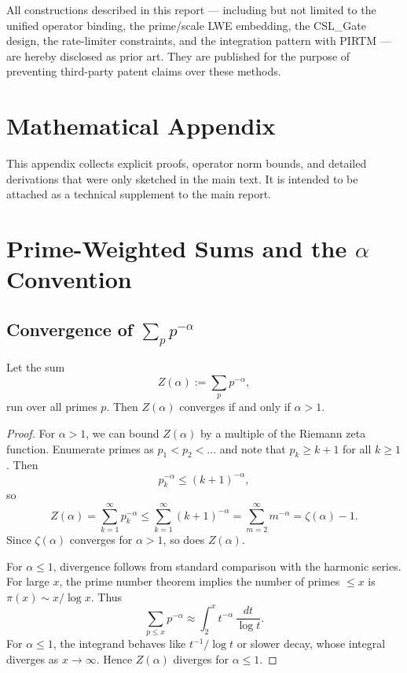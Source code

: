 \documentclass[11pt]{article}
\begin{document}
All constructions described in this report --- including but not limited to
the unified operator binding, the prime/scale LWE embedding, the CSL\_Gate
design, the rate-limiter constraints, and the integration pattern with PIRTM ---
are hereby disclosed as prior art. They are published for the purpose of
preventing third-party patent claims over these methods.

\appendix
\section*{Mathematical Appendix}

This appendix collects explicit proofs, operator norm bounds, and detailed
derivations that were only sketched in the main text. It is intended to be
attached as a technical supplement to the main report.

\section{Prime-Weighted Sums and the $\alpha$ Convention}

\subsection{Convergence of $\sum_{p} p^{-\alpha}$}

\begin{lemma}
Let the sum
\[
Z(\alpha) := \sum_{p} p^{-\alpha},
\]
run over all primes $p$. Then $Z(\alpha)$ converges if and only if $\alpha > 1$.
\end{lemma}

\begin{proof}
For $\alpha > 1$, we can bound $Z(\alpha)$ by a multiple of the Riemann zeta
function. Enumerate primes as $p_1 < p_2 < \dots$ and note that $p_k \ge k+1$
for all $k \ge 1$. Then
\[
p_k^{-\alpha} \le (k+1)^{-\alpha},
\]
so
\[
Z(\alpha) = \sum_{k=1}^\infty p_k^{-\alpha}
\le \sum_{k=1}^\infty (k+1)^{-\alpha}
= \sum_{m=2}^\infty m^{-\alpha}
= \zeta(\alpha) - 1.
\]
Since $\zeta(\alpha)$ converges for $\alpha > 1$, so does $Z(\alpha)$.

For $\alpha \le 1$, divergence follows from standard comparison with the
harmonic series. For large $x$, the prime number theorem implies the number
of primes $\le x$ is $\pi(x) \sim x / \log x$. Thus
\[
\sum_{p\le x} p^{-\alpha}
\approx \int_2^x t^{-\alpha}\,\frac{dt}{\log t}.
\]
For $\alpha \le 1$, the integrand behaves like $t^{-1}/\log t$ or slower
decay, whose integral diverges as $x\to\infty$. Hence $Z(\alpha)$ diverges
for $\alpha \le 1$.
\end{proof}
\end{document}
